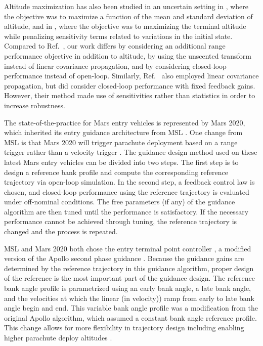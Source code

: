 \documentclass[journal ]{new-aiaa}
\begin{document}
Altitude maximization has also been studied in an uncertain setting in \cite{AltitudeUnderUncertainty}, where the objective was to maximize a function of the mean and standard deviation of altitude, and in \cite{MarsEntryDesensitized}, where the objective was to maximizing the terminal altitude while penalizing sensitivity terms related to variations in the initial state. Compared to Ref.~\cite{AltitudeUnderUncertainty}, our work differs by considering an additional range performance objective in addition to altitude, by using the unscented transform instead of linear covariance propagation, and by considering closed-loop performance instead of open-loop. Similarly, Ref.~\cite{MarsEntryDesensitized} also employed linear covariance propagation, but did consider closed-loop performance with fixed feedback gains. However, their method made use of sensitivities rather than statistics in order to increase robustness. 

The state-of-the-practice for Mars entry vehicles is represented by Mars 2020, which inherited its entry guidance architecture from MSL \cite{M2020_EDL}. One change from MSL is that Mars 2020 will trigger parachute deployment based on a range trigger rather than a velocity trigger \cite{TriggerComparison2020}.
The guidance design method used on these latest Mars entry vehicles \cite{MSL_EDL2,M2020_EDL} can be divided into two steps. The first step is to design a reference bank profile and compute the corresponding reference trajectory via open-loop simulation. In the second step, a feedback control law is chosen, and closed-loop performance using the reference trajectory is evaluated under off-nominal conditions. The free parameters (if any) of the guidance algorithm are then tuned until the performance is satisfactory. If the necessary performance cannot be achieved through tuning, the reference trajectory is changed and the process is repeated. 

MSL and Mars 2020 both chose the entry terminal point controller \cite{MSL_EDL, M2020_EDL}, a modified version of the Apollo second phase guidance \cite{MSL_EDL2}. Because the guidance gains are determined by the reference trajectory in this guidance algorithm, proper design of the reference is the most important part of the guidance design. The reference bank angle profile is parametrized using an early bank angle, a late bank angle, and the velocities at which the linear (in velocity)) ramp from early to late bank angle begin and end. This variable bank angle profile was a modification from the original Apollo algorithm, which assumed a constant bank angle reference profile. This change allows for more flexibility in trajectory design including enabling higher parachute deploy altitudes \cite{MSL_EDL2}.
\end{document}
